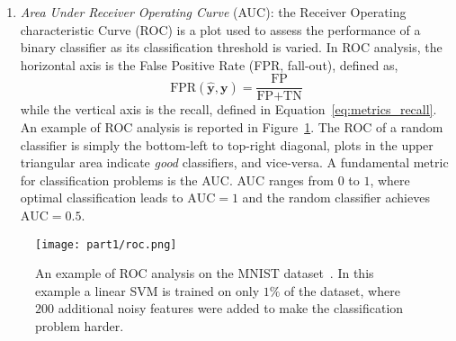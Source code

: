 \begin{enumerate}
\begin{enumerate}[label=(\roman*)]
    			\item \textit{Area Under Receiver Operating Curve} (\ac{AUC}): the Receiver Operating characteristic Curve (\ac{ROC}) is a plot used to assess the performance of a binary classifier as its classification threshold is varied. In ROC analysis, the horizontal axis is the False Positive Rate (\ac{FPR}, \aka fall-out), defined as,
    			\begin{equation} \label{eq:metrics_fpr}
    			\text{FPR}(\bm{\hat y}, \bm{y}) = \frac{\text{FP}}{\text{FP} + \text{TN}}
    			\end{equation}
				while the vertical axis is the recall, defined in Equation~\eqref{eq:metrics_recall}. An example of ROC analysis is reported in Figure~\ref{fig:roc}. The ROC of a random classifier is simply the bottom-left to top-right diagonal, plots in the upper triangular area indicate \textit{good} classifiers, and vice-versa. A fundamental metric for classification problems is the AUC. AUC ranges from $0$ to $1$, where optimal classification leads to $\text{AUC} = 1$ and the random classifier achieves $\text{AUC} = 0.5$.
    		\end{enumerate}
    	
        \begin{figure}[!h]
    		\centering
    		\texttt{[image: part1/roc.png]}
    		\caption{An example of ROC analysis on the MNIST dataset~\cite{lecun2010mnist}. In this example a linear SVM is trained on only $1\%$ of the dataset, where $200$ additional noisy features were added to make the classification problem harder.} \label{fig:roc}
    	\end{figure}


\end{enumerate}
